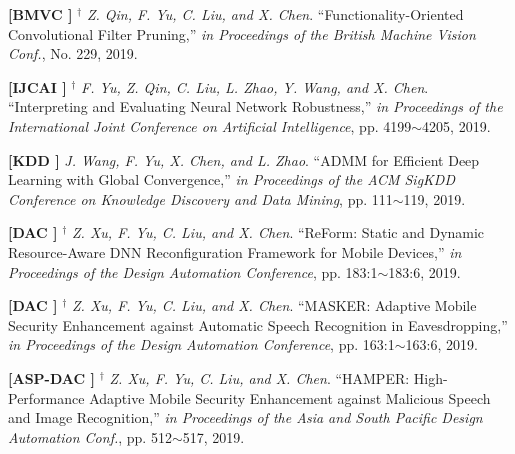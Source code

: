 	\textbf{[BMVC ]}
	$^\dagger$
	\textsl{Z. Qin, F. Yu, C. Liu, and X. Chen}.
		``Functionality-Oriented Convolutional Filter Pruning,''
		\textsl{in Proceedings of the British Machine Vision Conf.}, No. 229, 2019.
			\vspace{-4mm}
			\vspace{-3mm}

	\textbf{[IJCAI ]}
	$^\dagger$
	\textsl{F. Yu, Z. Qin, C. Liu, L. Zhao, Y. Wang, and X. Chen}.
		``Interpreting and Evaluating Neural Network Robustness,''
		\textsl{in Proceedings of the International Joint Conference on Artificial Intelligence}, pp. 4199$\sim$4205, 2019.
			\vspace{-3mm}

	\textbf{[KDD ]}\hspace{2mm}
	\textsl{J. Wang, F. Yu, X. Chen, and L. Zhao}.
		``ADMM for Efficient Deep Learning with Global Convergence,''
		\textsl{in Proceedings of the ACM SigKDD Conference on Knowledge Discovery and Data Mining}, pp. 111$\sim$119, 2019.
			\vspace{-3mm}

	\textbf{[DAC ]}
	$^\dagger$
	\textsl{Z. Xu, F. Yu, C. Liu, and X. Chen}.
		``ReForm\@: Static and Dynamic Resource-Aware DNN Reconfiguration Framework for Mobile Devices,''
		\textsl{in Proceedings of the Design Automation Conference}, pp. 183:1$\sim$183:6, 2019.
			\vspace{-3mm}

	\textbf{[DAC ]}
	$^\dagger$
	\textsl{Z. Xu, F. Yu, C. Liu, and X. Chen}.
		``MASKER\@: Adaptive Mobile Security Enhancement against Automatic Speech Recognition in Eavesdropping,''
		\textsl{in Proceedings of the Design Automation Conference}, pp. 163:1$\sim$163:6, 2019.
			\vspace{-3mm}


	\textbf{[ASP-DAC ]}
	$^\dagger$
	\textsl{Z. Xu, F. Yu, C. Liu, and X. Chen}.
		``HAMPER\@: High-Performance Adaptive Mobile Security Enhancement against Malicious Speech and Image Recognition,''
		\textsl{in Proceedings of the Asia and South Pacific Design Automation Conf.}, pp. 512$\sim$517, 2019.
			\vspace{-3mm}

